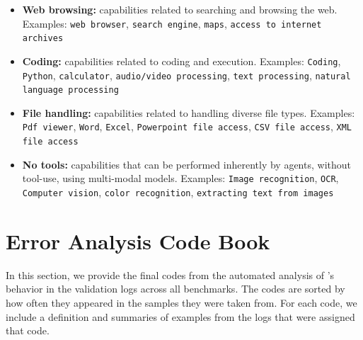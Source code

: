 \begin{itemize}
    \item \textbf{Web browsing:} capabilities related to searching and browsing the web. Examples: \texttt{web browser}, \texttt{search engine}, \texttt{maps}, \texttt{access to internet archives}
    \item \textbf{Coding:} capabilities related to coding and execution. Examples: \texttt{Coding}, \texttt{Python}, \texttt{calculator}, \texttt{audio/video processing}, \texttt{text processing}, \texttt{natural language processing}
    \item \textbf{File handling:} capabilities related to handling diverse file types. Examples: \texttt{Pdf viewer}, \texttt{Word}, \texttt{Excel}, \texttt{Powerpoint file access}, \texttt{CSV file access}, \texttt{XML file access}
    \item \textbf{No tools:} capabilities that can be performed inherently by agents, without tool-use, using multi-modal models. Examples: \texttt{Image recognition}, \texttt{OCR}, \texttt{Computer vision}, \texttt{color recognition}, \texttt{extracting text from images}
\end{itemize}

\newpage
\section{Error Analysis Code Book}
\label{sec:appendix:error}

In this section, we provide the final codes from the automated analysis of \team's behavior in the validation logs across all benchmarks. The codes are sorted by how often they appeared in the samples they were taken from. For each code, we include a definition and summaries of examples from the logs that were assigned that code.

{\small

}
